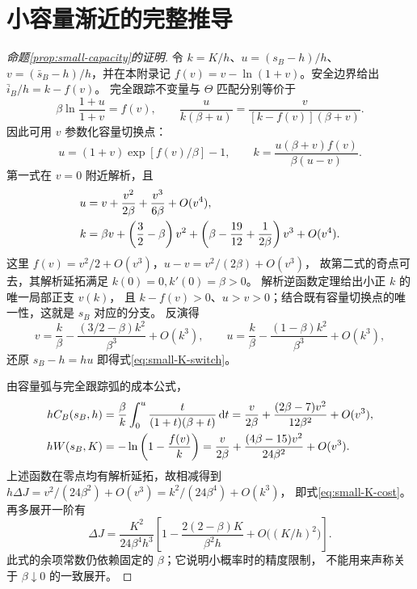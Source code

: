 \documentclass[11pt,a4paper,UTF8]{ctexart}
\theoremstyle{definition}
\newcommand{\dd}{\,\mathrm d}
\begin{document}
\section{小容量渐近的完整推导}
\label{app:small-capacity-proof}
\begin{proof}[命题\ref{prop:small-capacity}的证明]
令 $k=K/h$、$u=(s_B-h)/h$、$v=(\bar s_B-h)/h$，并在本附录记
$f(v)=v-\ln(1+v)$。安全边界给出 $\bar i_B/h=k-f(v)$。
完全跟踪不变量与 $\Theta$ 匹配分别等价于
\begin{equation}
 \beta\ln\frac{1+u}{1+v}=f(v),\qquad
 \frac{u}{k(\beta+u)}=
 \frac{v}{[k-f(v)](\beta+v)}.
 \label{eq:small-K-endpoint-match}
\end{equation}
因此可用 $v$ 参数化容量切换点：
\begin{equation}
 u=(1+v)\exp[f(v)/\beta]-1,\qquad
 k=\frac{u(\beta+v)f(v)}{\beta(u-v)}.
 \label{eq:small-K-parametrization}
\end{equation}
第一式在 $v=0$ 附近解析，且
\begin{align}
 u&=v+\frac{v^2}{2\beta}+\frac{v^3}{6\beta}+O(v^4),\notag\\
 k&=\beta v+\left(\frac32-\beta\right)v^2
   +\left(\beta-\frac{19}{12}+\frac1{2\beta}\right)v^3+O(v^4).
 \label{eq:small-K-param-series}
\end{align}
这里 $f(v)=v^2/2+O(v^3)$，$u-v=v^2/(2\beta)+O(v^3)$，
故第二式的奇点可去，其解析延拓满足 $k(0)=0,k'(0)=\beta>0$。
解析逆函数定理给出小正 $k$ 的唯一局部正支 $v(k)$，
且 $k-f(v)>0$、$u>v>0$；结合既有容量切换点的唯一性，这就是 $s_B$ 对应的分支。
反演得
\begin{equation}
 v=\frac k\beta-\frac{(3/2-\beta)k^2}{\beta^3}+O(k^3),\qquad
 u=\frac k\beta-\frac{(1-\beta)k^2}{\beta^3}+O(k^3),
 \label{eq:small-K-inverse}
\end{equation}
还原 $s_B-h=hu$ 即得式\eqref{eq:small-K-switch}。

由容量弧与完全跟踪弧的成本公式，
\begin{align}
 hC_B(s_B,h)
 &=\frac\beta k\int_0^u\frac{t}{(1+t)(\beta+t)}\dd t
 =\frac v{2\beta}+\frac{(2\beta-7)v^2}{12\beta^2}+O(v^3),\notag\\
 hW(s_B,K)
 &=-\ln\left(1-\frac{f(v)}k\right)
 =\frac v{2\beta}+\frac{(4\beta-15)v^2}{24\beta^2}+O(v^3).
 \label{eq:small-K-cost-series}
\end{align}
上述函数在零点均有解析延拓，故相减得到
$h\Delta J=v^2/(24\beta^2)+O(v^3)=k^2/(24\beta^4)+O(k^3)$，
即式\eqref{eq:small-K-cost}。
再多展开一阶有
\begin{equation}
 \Delta J=\frac{K^2}{24\beta^4h^3}
 \left[1-\frac{2(2-\beta)K}{\beta^2h}
       +O\bigl((K/h)^2\bigr)\right].
 \label{eq:small-K-precision}
\end{equation}
此式的余项常数仍依赖固定的 $\beta$；它说明小概率时的精度限制，
不能用来声称关于 $\beta\downarrow0$ 的一致展开。


\end{proof}
\end{document}
